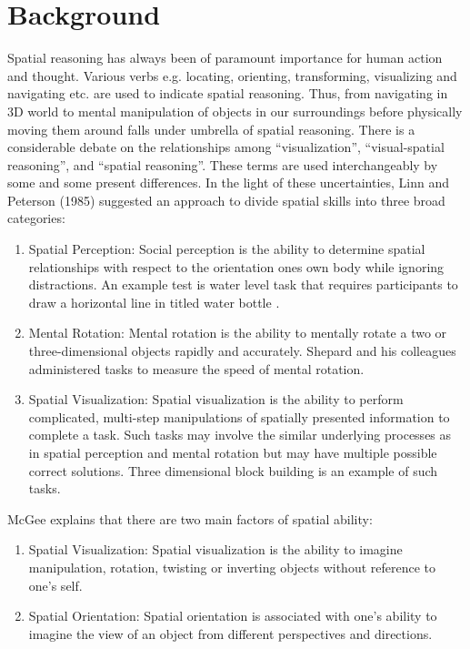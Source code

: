 \chapter{Background}
\label{chap:two}

Spatial reasoning has always been of paramount importance for human action and thought. Various verbs e.g. locating, orienting, transforming, visualizing and navigating etc. are used to indicate spatial reasoning. Thus, from navigating in 3D world to mental manipulation of objects in our surroundings before physically moving them around falls under umbrella of spatial reasoning. There is a considerable debate on the relationships among “visualization”, “visual-spatial reasoning”, and “spatial reasoning”. These terms are used interchangeably by some and some present differences. In the light of these uncertainties, Linn and Peterson (1985) \parencite{linn1986} suggested an approach to divide spatial skills into three broad categories:
\begin{enumerate}
    \item Spatial Perception: Social perception is the ability to determine spatial relationships with respect to the orientation one\textquotesingle s own body while ignoring distractions. An example test is water level task that requires participants to draw a horizontal line in titled water bottle \parencite{piaget2013growth}.
    \item Mental Rotation: Mental rotation is the ability to mentally rotate a two or three-dimensional objects rapidly and accurately. Shepard and his colleagues \parencite{cooperau1973time} \parencite{shepard1971mental} administered tasks to measure the speed of mental rotation.
    \item Spatial Visualization: Spatial visualization is the ability to perform complicated, multi-step manipulations of spatially presented information to complete a task. Such tasks may involve the similar underlying processes as in spatial perception and mental rotation but may have multiple possible correct solutions. Three dimensional block building is an example of such tasks.
\end{enumerate}
McGee \parencite{mcgee1979human} explains that there are two main factors of spatial ability:
\begin{enumerate}
    \item Spatial Visualization: Spatial visualization is the ability to imagine manipulation, rotation, twisting or inverting objects without reference to one's self. 
    \item Spatial Orientation: Spatial orientation is associated with one's ability to imagine the view of an object from different perspectives and directions. 
\end{enumerate}

